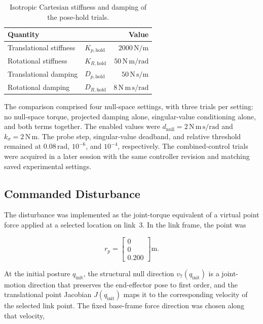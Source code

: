 \begin{table}[H]
\centering
\small
\caption{Isotropic Cartesian stiffness and damping of the pose-hold trials.}
\label{tab:experimental_hold_gains}
\begin{tabular}{@{}llr@{}}
\toprule
\textbf{Quantity} & & \textbf{Value}\\
\midrule
Translational stiffness & \(K_{p,\mathrm{hold}}\) & \(2000\,\mathrm{N/m}\)\\
Rotational stiffness    & \(K_{R,\mathrm{hold}}\) & \(50\,\mathrm{N\,m/rad}\)\\
Translational damping   & \(D_{p,\mathrm{hold}}\) & \(50\,\mathrm{N\,s/m}\)\\
Rotational damping      & \(D_{R,\mathrm{hold}}\) & \(8\,\mathrm{N\,m\,s/rad}\)\\
\bottomrule
\end{tabular}
\end{table}

The comparison comprised four null-space settings, with three trials per
setting: no null-space torque, projected damping alone, singular-value
conditioning alone, and both terms together. The enabled values were
\(d_{\mathrm{null}}=2\,\mathrm{N\,m\,s/rad}\) and
\(k_\sigma=2\,\mathrm{N\,m}\). The probe step, singular-value deadband,
and relative  threshold remained at \(0.08\,\mathrm{rad}\),
\(10^{-6}\), and \(10^{-4}\), respectively.
The combined-control trials were acquired in a later session with the same
controller revision and matching saved experimental settings.


\subsection{Commanded Disturbance}

The disturbance was implemented as the joint-torque equivalent of a virtual
point force applied at a selected location on link~3. In the link frame, the
point was

\begin{equation}
r_p
=
\begin{bmatrix}
0\\
0\\
0.200
\end{bmatrix}
\mathrm{m}.
\label{eq:nullspace_disturbance_point}
\end{equation}

At the initial posture \(q_{\mathrm{init}}\), the structural null direction
\(v_7(q_{\mathrm{init}})\) is a joint-motion direction that preserves the
end-effector pose to first order, and the translational point Jacobian
\(J(q_{\mathrm{init}})\) maps it to the corresponding velocity of the
selected link point. The fixed base-frame force direction was chosen along that
velocity,

